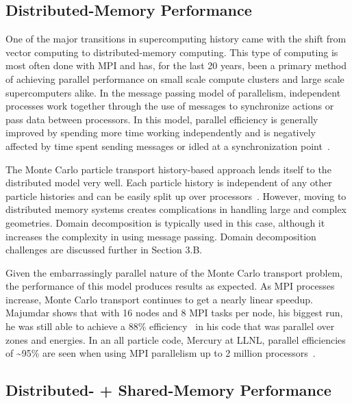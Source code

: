 \subsection*{ \textbf{Distributed-Memory Performance}}

One of the major transitions in supercomputing history came with the shift from vector computing to distributed-memory computing.
%
This type of computing is most often done with MPI and has, for the last 20 years, been a primary method of achieving parallel performance on small scale compute clusters and large scale supercomputers alike.
%
In the message passing model of parallelism, independent processes work together through the use of messages to synchronize actions or pass data between processors.
%
In this model, parallel efficiency is generally improved by spending more time working independently and is negatively affected by time spent sending messages or idled at a synchronization point~\cite{yanghybrid}.
%

%
The Monte Carlo particle transport history-based approach lends itself to the distributed model very well.
%
Each particle history is independent of any other particle histories and can be easily split up over processors~\cite{yanghybrid}.
%
However, moving to distributed memory systems creates complications in handling large and complex geometries.
%
Domain decomposition is typically used in this case, although it increases the complexity in using message passing.
%
Domain decomposition challenges are discussed further in Section 3.B.
%

%
Given the embarrassingly parallel nature of the Monte Carlo transport problem, the performance of this model produces results as expected.
%
As MPI processes increase, Monte Carlo transport continues to get a nearly linear speedup.
%
Majumdar shows that with 16 nodes and 8 MPI tasks per node, his biggest run, he was still able to achieve a 88\% efficiency~\cite{majumdar2000parallel} in his code that was parallel over zones and energies.
%
In an all particle code, Mercury at LLNL, parallel efficiencies of \textasciitilde95\% are seen when using MPI parallelism up to 2 million processors~\cite{o2013scalable}.

\subsection*{ \textbf{Distributed- + Shared-Memory Performance}}

